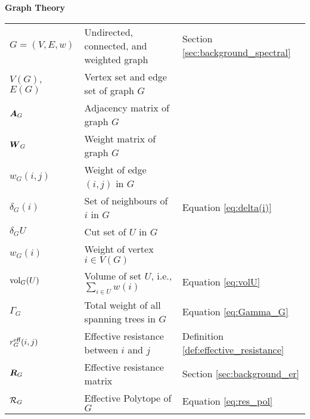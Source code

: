 \vspace{\groupsep}

\noindent \textbf{Graph Theory}\\
\vspace{\headingsep}
\begin{longtable}{p{\colwidth}p{\descsep}l}
	$G=(V,E,w)$ & Undirected, connected, and weighted graph & Section \ref{sec:background_spectral}\\
	$V(G)$, $E(G)$ & Vertex set and edge set of graph $G$\\
	$\vb*{A}_G$ & {Adjacency matrix of graph $G$}\\
	{$\vb*{W}_G$} & {Weight matrix of graph $G$}\\
	$w_G(i,j)$ & Weight of edge $(i,j)$ in $G$ \\
	$\delta_G(i)$ & Set of neighbours of $i$ in $G$ & Equation \eqref{eq:delta(i)}\\
	$\delta_G U$ & Cut set of $U$ in $G$ \\
	$w_G(i)$ & Weight of vertex $i\in V(G)$\\
	$\textnormal{vol}_G(U)$ & Volume of set $U$, i.e., $\sum_{i\in U}w(i)$ & Equation \eqref{eq:volU}\\
	$\Gamma_G$ & Total weight of all spanning trees in $G$ & Equation \eqref{eq:Gamma_G} \\
	$r^{\text{eff}}_G(i,j)$  & Effective resistance between $i$ and $j$ & Definition \ref{def:effective_resistance}\\
	$\vb*{R}_G$  & Effective resistance matrix & Section \ref{sec:background_er}\\
	$\mathcal{R}_G$ & Effective Polytope of $G$ & Equation \eqref{eq:res_pol}
\end{longtable}
\vspace{\groupsep}


